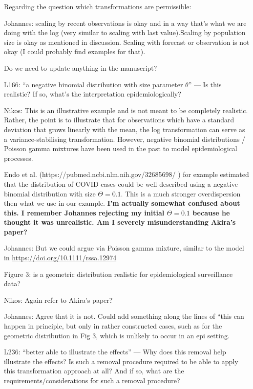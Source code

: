 \documentclass{article}
\newcommand{\red}{\color{red}}
\newcommand{\black}{\color{black}}
\begin{document}
Regarding the question which transformations are permissible: 

Johannes: scaling by recent observations is okay and in a way that's what we are doing with the log (very similar to scaling with last value).Scaling by population size is okay as mentioned in discussion. Scaling with forecast or observation is not okay (I could probably find examples for that).

Do we need to update anything in the manuscript? 

\red
L166: “a negative binomial distribution with size parameter $\theta$” — Is this realistic? If so, what’s the interpretation epidemiologically?

\black
Nikos: This is an illustrative example and is not meant to be completely realistic. Rather, the point is to illustrate that for observations which have a standard deviation that grows linearly with the mean, the log transformation can serve as a variance-stabilising transformation. However, negative binomial distributions / Poisson gamma mixtures have been used in the past to model epidemiological processes. 

Endo et al. (https://pubmed.ncbi.nlm.nih.gov/32685698/ ) for example estimated that the distribution of COVID cases could be well described using a negative binomial distribution with size $\Theta = 0.1$. This is a much stronger overdispersion then what we use in our example. 
\textbf{I'm actually somewhat confused about this. I remember Johannes rejecting my initial $\Theta = 0.1$ because he thought it was unrealistic. Am I severely misunderstanding Akira's paper?}


Johannes: But we could argue via Poisson gamma mixture, similar to the model in \url{https://doi.org/10.1111/rssa.12974}

\red
Figure 3: is a geometric distribution realistic for epidemiological surveillance data?

\black
Nikos: Again refer to Akira's paper? 

Johannes: Agree that it is not. Could add something along the lines of ``this can happen in principle, but only in rather constructed cases, such as for the geometric distribution in Fig 3, which is unlikely to occur in an epi setting.

\red
L236: “better able to illustrate the effects” — Why does this removal help illustrate the effects? Is such a removal procedure required to be able to apply this transformation approach at all? And if so, what are the requirements/considerations for such a removal procedure?
\end{document}
